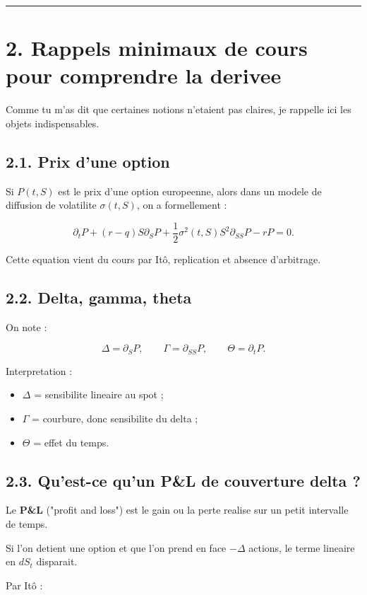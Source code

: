\documentclass[11pt,a4paper]{article}
\begin{document}
\bigskip\hrule\bigskip

\section{2. Rappels minimaux de cours pour comprendre la derivee}

Comme tu m'as dit que certaines notions n'etaient pas claires, je rappelle ici les objets indispensables.

\subsection{2.1. Prix d'une option}

Si \(P(t,S)\) est le prix d'une option europeenne, alors dans un modele de diffusion de volatilite \(\sigma(t,S)\), on a formellement :

\[
\partial_t P+(r-q)S\partial_S P+\frac12 \sigma^2(t,S)S^2\partial_{SS}P-rP=0.
\]

Cette equation vient du cours par Itô, replication et absence d'arbitrage.

\subsection{2.2. Delta, gamma, theta}

On note :

\[
\Delta=\partial_S P,\qquad
\Gamma=\partial_{SS}P,\qquad
\Theta=\partial_t P.
\]

Interpretation :

\begin{itemize}
\item \(\Delta\) = sensibilite lineaire au spot ;
\item \(\Gamma\) = courbure, donc sensibilite du delta ;
\item \(\Theta\) = effet du temps.
\end{itemize}

\subsection{2.3. Qu'est-ce qu'un P\&L de couverture delta ?}

Le \textbf{P\&L} ("profit and loss") est le gain ou la perte realise sur un petit intervalle de temps.

Si l'on detient une option et que l'on prend en face \(-\Delta\) actions, le terme lineaire en \(dS_t\) disparait.

Par Itô :
\end{document}
